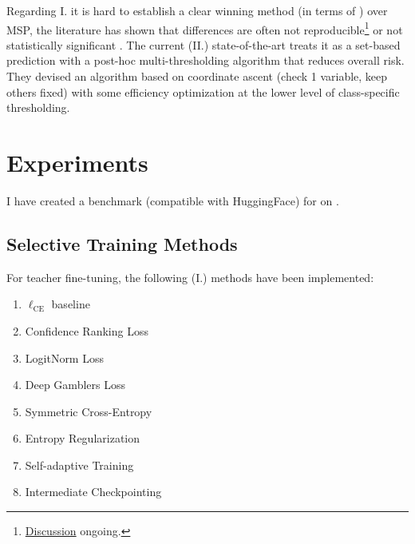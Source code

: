 Regarding I. it is hard to establish a clear winning method (in terms of \AURC) over MSP, the literature has shown that differences are often not reproducible\footnote{\href{https://github.com/LayneH/SAT-selective-cls/issues/3\#issuecomment-1640151933}{Discussion} ongoing.} or not statistically significant \cite{jaeger2023a}.
The current (II.) state-of-the-art \cite{lin2022scrib} treats it as a set-based prediction with a post-hoc multi-thresholding algorithm that reduces overall risk. They devised an algorithm based on coordinate ascent (check 1 variable, keep others fixed) with some efficiency optimization at the lower level of class-specific thresholding. 









\section{Experiments}

I have created a benchmark (compatible with HuggingFace) for \KD{} on \DC{}.


\subsection{Selective Training Methods}

For teacher fine-tuning, the following (I.) methods have been implemented: 

\begin{enumerate}
    \item $\ell_{\mathrm{CE}}$ baseline 
    \item Confidence Ranking Loss \cite{moon2020confidence}
    \item LogitNorm Loss \cite{wei2022mitigating}
    \item Deep Gamblers Loss \cite{liu2019deep}
    \item Symmetric Cross-Entropy \cite{wang2019symmetric}
    \item Entropy Regularization \cite{feng2022stop} 
    \item Self-adaptive Training \cite{huang2020self}
    \item Intermediate Checkpointing \cite{wang2022efficient}
\end{enumerate}

